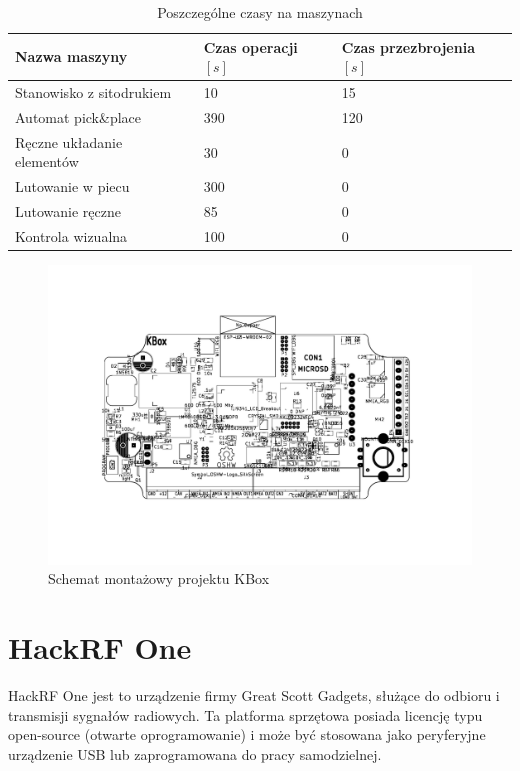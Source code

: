 \begin{table}[H]
	\centering
	\caption{Poszczególne czasy na maszynach}
	\begin{tabular}{lll}
		\toprule
		Nazwa maszyny                 & Czas operacji $[s]$ & Czas przezbrojenia $[s]$ \\
		\midrule
		Stanowisko z sitodrukiem      & 10                  & 15                       \\
		Automat pick\&place           & 390                 & 120                      \\
		Ręczne układanie elementów & 30                  & 0                        \\
		Lutowanie w piecu             & 300                 & 0                        \\
		Lutowanie ręczne             & 85                  & 0                        \\
		Kontrola wizualna             & 100                 & 0                        \\
		\bottomrule
	\end{tabular}
\end{table}

\begin{figure}[H]
	\centering
	\includegraphics[scale=0.7,clip, trim=3.8cm 4cm 3.8cm 3cm]{chapters/chapter5/kbox-rotated.pdf}
	\caption{Schemat montażowy projektu KBox}
	\label{kbox}
\end{figure}

\newpage
\section{HackRF One}
HackRF One jest to urządzenie firmy Great Scott Gadgets, służące do odbioru i transmisji sygnałów radiowych. Ta platforma sprzętowa posiada licencję typu open-source (otwarte oprogramowanie) i może być stosowana jako peryferyjne urządzenie USB lub zaprogramowana do pracy samodzielnej.

